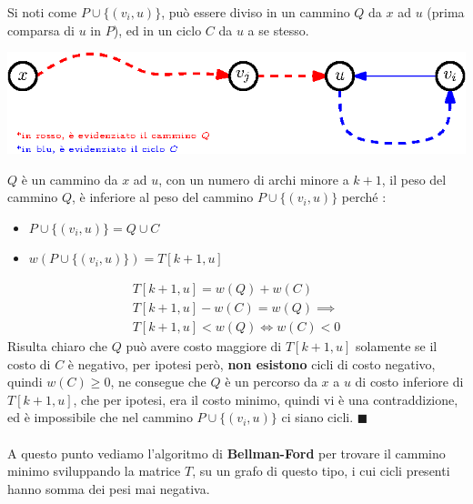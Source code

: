\documentclass[12pt, letterpaper]{article}
\newcommand{\acc}{\\\hphantom{}\\}
\begin{document}
Si noti come $P\cup \{(v_i,u)\}$, può essere diviso in un cammino $Q$ da $x$ ad $u$ (prima comparsa di $u$ in $P$), ed in 
un ciclo $C$ da $u$ a se stesso.\begin{center}
    \includegraphics[width=1\textwidth ]{images/dimNoCicli2.eps}
\end{center}
$Q$ è un cammino da $x$ ad $u$, con un numero di archi minore a $k+1$, il peso del cammino $Q$, è inferiore al peso 
del cammino $P\cup \{(v_i,u)\}$ perché : \begin{itemize}
    \item $P\cup \{(v_i,u)\} = Q\cup C$
    \item $w(P\cup \{(v_i,u)\})=T[k+1,u]$
\end{itemize}\begin{eqnarray}
    T[k+1,u] = w(Q) + w(C) \\
    T[k+1,u] - w(C) = w(Q) \implies  \\
    T[k+1,u] < w(Q) \iff w(C)<0
\end{eqnarray} 
Risulta chiaro che $Q$ può avere costo maggiore di $T[k+1,u]$ solamente se il costo di $C$ è negativo, per ipotesi però, 
\textbf{non esistono} cicli di costo negativo, quindi $w(C)\ge 0$, ne consegue che $Q$ è un percorso da $x$ a $u$ di costo 
inferiore di $T[k+1,u]$, che per ipotesi, era il costo minimo, quindi vi è una contraddizione, ed è impossibile che 
nel cammino   $P\cup\{(v_i,u)\}$ ci siano cicli. $\blacksquare$\acc 
A questo punto vediamo l'algoritmo di \textbf{Bellman-Ford} per trovare il cammino minimo sviluppando la matrice $T$, su un 
grafo di questo tipo, i cui cicli presenti hanno somma dei pesi mai negativa. 
\end{document}
